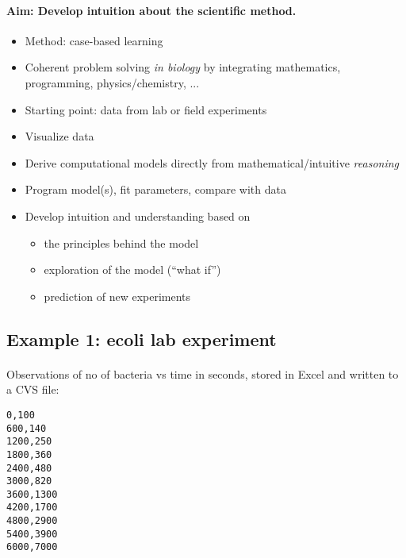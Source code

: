 \documentclass[%
twoside,                 %
final,                   %
10pt]{article}
\begin{document}
\paragraph{Aim: Develop intuition about the scientific method.}
\begin{itemize}
 \item Method: case-based learning

 \item Coherent problem solving \emph{in biology} by integrating
   mathematics, programming, physics/chemistry, ...

 \item Starting point: data from lab or field experiments

 \item Visualize data

 \item Derive computational models directly from mathematical/intuitive \emph{reasoning}

 \item Program model(s), fit parameters, compare with data

 \item Develop intuition and understanding based on
\begin{itemize}

  \item the principles behind the model

  \item exploration of the model (``what if'')

  \item prediction of new experiments
\end{itemize}

\noindent
\end{itemize}

\noindent



\subsection*{Example 1: ecoli lab experiment}


\paragraph{}
Observations of no of bacteria vs time in seconds,
stored in Excel and written to a CVS file:

\begin{verbatim}
0,100
600,140
1200,250
1800,360
2400,480
3000,820
3600,1300
4200,1700
4800,2900
5400,3900
6000,7000
\end{verbatim}
\end{document}
